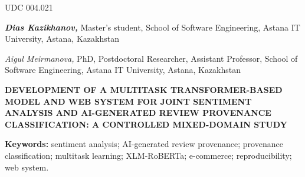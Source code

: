 \documentclass[11pt,a4paper]{article}
\begin{document}
\begin{center}
{\small UDC 004.021\par}
\vspace{0.35em}
{\bfseries\itshape Dias Kazikhanov,} Master's student, School of Software Engineering, Astana IT University, Astana, Kazakhstan\par
{\itshape Aigul Meirmanova,} PhD, Postdoctoral Researcher, Assistant Professor, School of Software Engineering, Astana IT University, Astana, Kazakhstan\par
\vspace{0.7em}
{\bfseries\large DEVELOPMENT OF A MULTITASK TRANSFORMER-BASED MODEL AND WEB SYSTEM FOR JOINT SENTIMENT ANALYSIS AND AI-GENERATED REVIEW PROVENANCE CLASSIFICATION: A CONTROLLED MIXED-DOMAIN STUDY\par}
\end{center}

\begin{abstract}
Online reviews combine an evaluative signal with information about how a text was produced. This article presents the completed experimental stage of a dissertation project that develops a multitask Transformer-based model and the ReviewGuard web system for joint review analysis. The model predicts three-way sentiment and a provenance label that is operationalized as human-authored versus AI-generated text in the MAiDE-up resource; this definition is narrower than universal fake-review detection. A corpus of 30,000 records was assembled from four open datasets. TF--IDF with logistic regression, two single-task XLM-RoBERTa models, and one shared-encoder multitask model were compared under one leakage-controlled split and five training seeds. The multitask model reached test Macro-F1 of 0.7709 $\pm$ 0.0087 for sentiment and 0.9526 $\pm$ 0.0094 for provenance, compared with 0.7161 and 0.8998 for the classical baseline. Differences from the single-task Transformer were inconclusive: $-0.0013$ for sentiment and $-0.0046$ for provenance. The result supports a compact shared service, but not a claim of positive transfer or universal authenticity detection. The web layer exposes predictions, confidence, truncation status, and research-context warnings for human-in-the-loop use.
\end{abstract}

\noindent\textbf{Keywords:} sentiment analysis; AI-generated review provenance; provenance classification; multitask learning; XLM-RoBERTa; e-commerce; reproducibility; web system.
\end{document}
